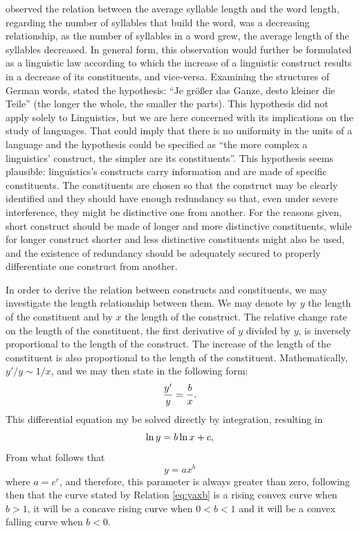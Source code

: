 \cite{menzerath1928} observed the relation between the average syllable length and 
the word length, regarding the number of syllables that build the word, was a
decreasing relationship, as the number of syllables in a word grew, the average length
of the syllables decreased. In general form, this observation would further be formulated as
a linguistic law according to which the increase of a linguistic construct results 
in a decrease of its constituents, and vice-versa. 
Examining the structures of German words, \cite{menzerath1954} stated the hypothesis:
``Je größer das Ganze, desto kleiner die Teile'' (the longer the whole, the smaller the parts).
This hypothesis did not apply solely to Linguistics, but we are here concerned with its implications
on the study of languages. That could imply that there is no uniformity in the units of
a language and the hypothesis could be specified as ``the more complex a linguistics' construct,
the simpler are its constituents''. This hypothesis seems plausible: linguistics's constructs
carry information and are made of specific constituents. The constituents are chosen
so that the construct may be clearly identified and they should have enough redundancy so that, 
even under severe interference, they might be distinctive one from another. For the reasons given,
short construct should be made of longer and more distinctive constituents, while for longer
construct shorter and less distinctive constituents might also be used, and the existence of redundancy
should be adequately secured to properly differentiate one construct from another.

In order to derive the relation between constructs and constituents, we may investigate the length
relationship between them. We may denote by $y$ the length of the constituent and by $x$ the length
of the construct. The relative change rate on the length of the constituent, the first derivative of
$y$ divided by $y$, is inversely proportional to the length of the construct. 
The increase of the length of the constituent is also proportional to the length of the constituent. 
Mathematically,
$y'/y \sim 1/x$, and we may then state in the following form:
\begin{equation}
\frac{y'}{y} = \frac{b}{x} \textmd{.}
\end{equation}
This differential equation my be solved directly by integration, resulting in
\begin{equation}
\ln y = b \ln x + c \textmd{,}
\end{equation}
From what follows that
\begin{equation}
y = a x^b
\label{eq:yaxb}
\end{equation}
where $a = e^c$, and therefore, this parameter is always greater than zero,
following then that the curve stated by Relation \ref{eq:yaxb} is a rising convex curve
when $b > 1$, it will be a concave rising curve when $0 < b < 1$ and it will be
a convex falling curve when $b < 0$.

